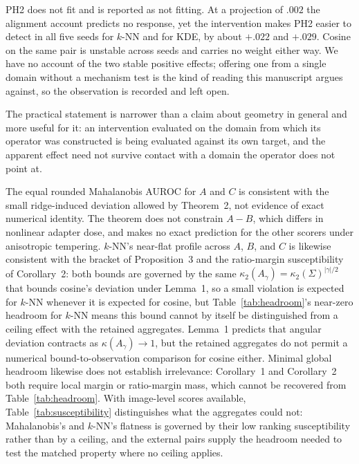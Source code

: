 \documentclass[11pt,a4paper]{article}
\begin{document}
PH2 does not fit and is reported as not fitting. At a projection of $.002$ the
alignment account predicts no response, yet the intervention makes PH2 easier
to detect in all five seeds for $k$-NN and for KDE, by about $+.022$ and
$+.029$. Cosine on the same pair is unstable across seeds and carries no weight
either way. We have no account of the two stable positive effects; offering one
from a single domain without a mechanism test is the kind of reading this
manuscript argues against, so the observation is recorded and left open.

The practical statement is narrower than a claim about geometry in general and
more useful for it: an intervention evaluated on the domain from which its
operator was constructed is being evaluated against its own target, and the
apparent effect need not survive contact with a domain the operator does not
point at.

The equal rounded Mahalanobis AUROC for $A$ and $C$ is consistent with the small ridge-induced deviation allowed by Theorem~2, not evidence of exact numerical identity. The theorem does not constrain $A-B$, which differs in nonlinear adapter dose, and makes no exact prediction for the other scorers under anisotropic tempering. $k$-NN's near-flat profile across $A$, $B$, and $C$ is likewise consistent with the bracket of Proposition~3 and the ratio-margin susceptibility of Corollary~2: both bounds are governed by the same $\kappa_2(A_\gamma)=\kappa_2(\Sigma)^{|\gamma|/2}$ that bounds cosine's deviation under Lemma~1, so a small violation is expected for $k$-NN whenever it is expected for cosine, but Table~\ref{tab:headroom}'s near-zero headroom for $k$-NN means this bound cannot by itself be distinguished from a ceiling effect with the retained aggregates. Lemma~1 predicts that angular deviation contracts as $\kappa(A_\gamma)\rightarrow1$, but the retained aggregates do not permit a numerical bound-to-observation comparison for cosine either. Minimal global headroom likewise does not establish irrelevance: Corollary~1 and Corollary~2 both require local margin or ratio-margin mass, which cannot be recovered from Table~\ref{tab:headroom}. With image-level scores available, Table~\ref{tab:susceptibility} distinguishes what the aggregates could not: Mahalanobis's and $k$-NN's flatness is governed by their low ranking susceptibility rather than by a ceiling, and the external pairs supply the headroom needed to test the matched property where no ceiling applies.
\end{document}
